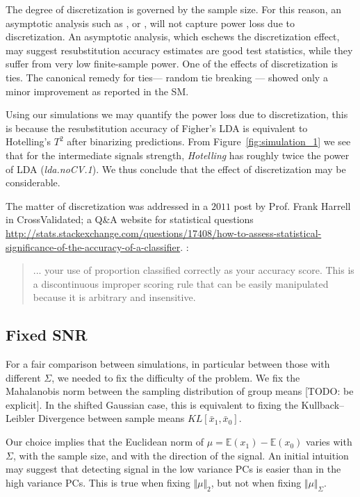 \documentclass[]{bio}
\begin{document}
The degree of discretization is governed by the sample size. 
For this reason, an asymptotic analysis such as \cite{ramdas_classification_2016}, or \cite{golland_permutation_2005}, will not capture power loss due to discretization. 
An asymptotic analysis, which eschews the discretization effect,  may suggest resubstitution accuracy estimates are good test statistics, while they suffer from very low finite-sample power. 
One of the effects of discretization is ties. 
The canonical remedy for ties--- random tie breaking --- showed only a minor improvement as reported in the SM.

Using our simulations we may quantify the power loss due to discretization, this is because the resubstitution accuracy of Figher's LDA is equivalent to Hotelling's $T^2$ after binarizing predictions. 
From Figure~\ref{fig:simulation_1} we see that for the intermediate signals strength, \emph{Hotelling} has roughly twice the power of LDA (\emph{lda.noCV.1}).
We thus conclude that the effect of discretization may be considerable. 


The matter of discretization was addressed in a $2011$ post by Prof. Frank Harrell in \textsf{CrossValidated}; a Q\&A website for statistical questions \url{http://stats.stackexchange.com/questions/17408/how-to-assess-statistical-significance-of-the-accuracy-of-a-classifier}. :
\begin{quote}
	... your use of proportion classified correctly as your accuracy score. This is a discontinuous improper scoring rule that can be easily manipulated because it is arbitrary and insensitive.
\end{quote}






\subsection{Fixed SNR}
\label{sec:fix_snr}

For a fair comparison between simulations, in particular between those with different $\Sigma$, we needed to fix the difficulty of the problem.
We fix the Mahalanobis norm between the sampling distribution of group means [TODO: be explicit]. 
In the shifted Gaussian case, this is equivalent to fixing the Kullback–Leibler Divergence between sample means $KL[\bar x_1,\bar x_0]$.

Our choice implies that the Euclidean norm of $\mu=\mathbb{E}(x_1)-\mathbb{E}(x_0)$ varies with $\Sigma$, with the sample size, and with the direction of the signal.
An initial intuition may suggest that detecting signal in the low variance PCs is easier than in the high variance PCs. 
This is true when fixing $\Vert \mu \Vert_2$, but not when fixing $\Vert \mu \Vert_{\Sigma}$.
\end{document}
